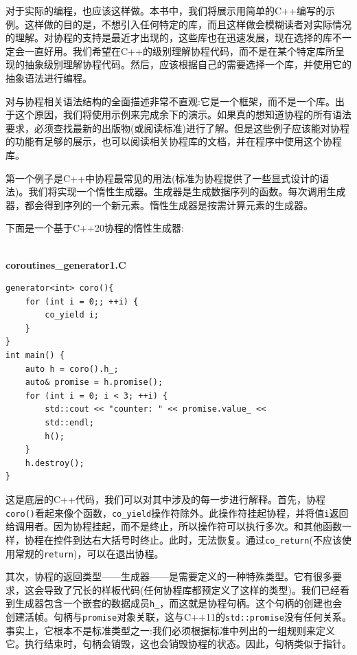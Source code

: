 对于实际的编程，也应该这样做。本书中，我们将展示用简单的C++编写的示例。这样做的目的是，不想引入任何特定的库，而且这样做会模糊读者对实际情况的理解。对协程的支持是最近才出现的，这些库也在迅速发展，现在选择的库不一定会一直好用。我们希望在C++的级别理解协程代码，而不是在某个特定库所呈现的抽象级别理解协程代码。然后，应该根据自己的需要选择一个库，并使用它的抽象语法进行编程。

对与协程相关语法结构的全面描述非常不直观:它是一个框架，而不是一个库。出于这个原因，我们将使用示例来完成余下的演示。如果真的想知道协程的所有语法要求，必须查找最新的出版物(或阅读标准)进行了解。但是这些例子应该能对协程的功能有足够的展示，也可以阅读相关协程库的文档，并在程序中使用这个协程库。


第一个例子是C++中协程最常见的用法(标准为协程提供了一些显式设计的语法)。我们将实现一个惰性生成器。生成器是生成数据序列的函数。每次调用生成器，都会得到序列的一个新元素。惰性生成器是按需计算元素的生成器。

下面是一个基于C++20协程的惰性生成器:

\hspace*{\fill} \\ %
\noindent
\textbf{coroutines\_generator1.C}
\begin{lstlisting}[style=styleCXX]
generator<int> coro(){
	for (int i = 0;; ++i) {
		co_yield i;
	}
}
int main() {
	auto h = coro().h_;
	auto& promise = h.promise();
	for (int i = 0; i < 3; ++i) {
		std::cout << "counter: " << promise.value_ << 
		std::endl;
		h();
	}
	h.destroy();
}
\end{lstlisting}

这是底层的C++代码，我们可以对其中涉及的每一步进行解释。首先，协程\texttt{coro()}看起来像个函数，\texttt{co\_yield}操作符除外。此操作符挂起协程，并将值\texttt{i}返回给调用者。因为协程挂起，而不是终止，所以操作符可以执行多次。和其他函数一样，协程在控件到达右大括号时终止。此时，无法恢复。通过\texttt{co\_return}(不应该使用常规的\texttt{return})，可以在退出协程。

其次，协程的返回类型——生成器——是需要定义的一种特殊类型。它有很多要求，这会导致了冗长的样板代码(任何协程库都预定义了这样的类型)。我们已经看到生成器包含一个嵌套的数据成员\texttt{h\_}，而这就是协程句柄。这个句柄的创建也会创建活帧。句柄与\texttt{promise}对象关联，这与C++11的\texttt{std::promise}没有任何关系。事实上，它根本不是标准类型之一:我们必须根据标准中列出的一组规则来定义它。执行结束时，句柄会销毁，这也会销毁协程的状态。因此，句柄类似于指针。

